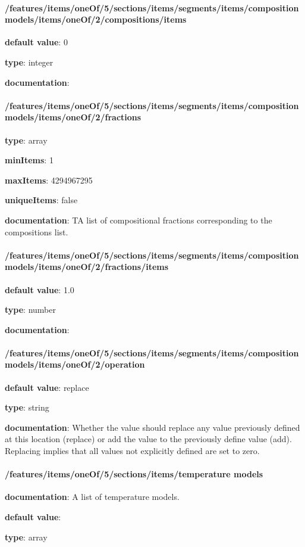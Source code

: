 \begin{itemized}
\paragraph{/features/items/oneOf/5/sections/items/segments/items/composition models/items/oneOf/2/compositions/items} \begin{itemized}
\item {\bf default value}: 0
\item {\bf type}: integer
\item {\bf documentation}: 
\end{itemized}\end{itemized}\paragraph{/features/items/oneOf/5/sections/items/segments/items/composition models/items/oneOf/2/fractions} \begin{itemized}
\item {\bf type}: array
\item {\bf minItems}: 1
\item {\bf maxItems}: 4294967295
\item {\bf uniqueItems}: false
\item {\bf documentation}: TA list of compositional fractions corresponding to the compositions list.
\paragraph{/features/items/oneOf/5/sections/items/segments/items/composition models/items/oneOf/2/fractions/items} \begin{itemized}
\item {\bf default value}: 1.0
\item {\bf type}: number
\item {\bf documentation}: 
\end{itemized}\end{itemized}\paragraph{/features/items/oneOf/5/sections/items/segments/items/composition models/items/oneOf/2/operation} \begin{itemized}
\item {\bf default value}: replace
\item {\bf type}: string
\item {\bf documentation}: Whether the value should replace any value previously defined at this location (replace) or add the value to the previously define value (add). Replacing implies that all values not explicitly defined are set to zero.
\end{itemized}\paragraph{/features/items/oneOf/5/sections/items/temperature models} \begin{itemized}
\item {\bf documentation}: A list of temperature models.
\item {\bf default value}: 
\item {\bf type}: array

\end{itemized}
